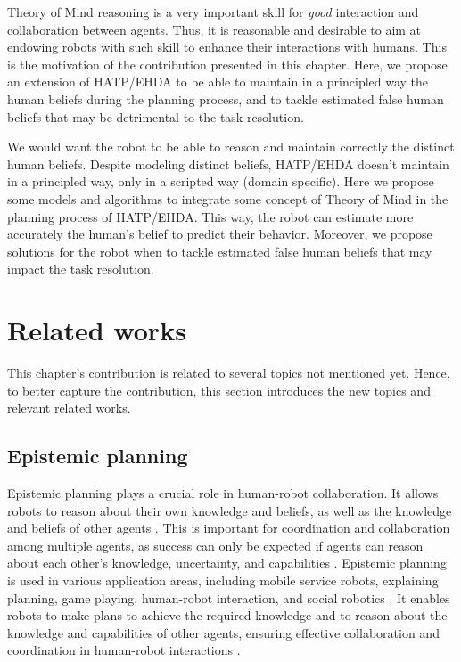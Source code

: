 Theory of Mind reasoning is a very important skill for \textit{good} interaction and collaboration between agents. Thus, it is reasonable and desirable to aim at endowing robots with such skill to enhance their interactions with humans. This is the motivation of the contribution presented in this chapter. Here, we propose an extension of HATP/EHDA to be able to maintain in a principled way the human beliefs during the planning process, and to tackle estimated false human beliefs that may be detrimental to the task resolution.

We would want the robot to be able to reason and maintain correctly the distinct human beliefs. Despite modeling distinct beliefs, HATP/EHDA doesn't maintain in a principled way, only in a scripted way (domain specific). Here we propose some models and algorithms to integrate some concept of Theory of Mind in the planning process of HATP/EHDA. This way, the robot can estimate more accurately the human's belief to predict their behavior. Moreover, we propose solutions for the robot when to tackle estimated false human beliefs that may impact the task resolution.




\section{Related works}

    This chapter's contribution is related to several topics not mentioned yet. Hence, to better capture the contribution, this section introduces the new topics and relevant related works.  

    \subsection{Epistemic planning}
    Epistemic planning plays a crucial role in human-robot collaboration. It allows robots to reason about their own knowledge and beliefs, as well as the knowledge and beliefs of other agents \cite{bramblett_epistemic_2023}. This is important for coordination and collaboration among multiple agents, as success can only be expected if agents can reason about each other's knowledge, uncertainty, and capabilities \cite{bramblett_epistemic_prediction_2023}. Epistemic planning is used in various application areas, including mobile service robots, explaining planning, game playing, human-robot interaction, and social robotics \cite{hu_planning_2023}. It enables robots to make plans to achieve the required knowledge and to reason about the knowledge and capabilities of other agents, ensuring effective collaboration and coordination in human-robot interactions \cite{belle_epistemic_2023}.


